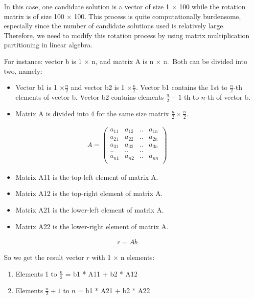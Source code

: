 \documentclass[
]{article}
\providecommand{\tightlist}{%
  \setlength{\itemsep}{0pt}\setlength{\parskip}{0pt}}
\begin{document}
In this case, one candidate solution is a vector of size 1 \(\times\)
100 while the rotation matrix is of size 100 \(\times\) 100. This
process is quite computationally burdensome, especially since the number
of candidate solutions used is relatively large. Therefore, we need to
modify this rotation process by using matrix multiplication partitioning
in linear algebra.

For instance: vector b is 1 \(\times\) n, and matrix A is n \(\times\)
n.~Both can be divided into two, namely:

\begin{itemize}
\tightlist
\item
  Vector b1 is 1 \(\times \frac{n}{2}\) and vector b2 is 1
  \(\times \frac{n}{2}\). Vector b1 contains the 1st to
  \(\frac{n}{2}\)-th elements of vector b. Vector b2 contains elements
  \(\frac{n}{2} + 1\)-th to \(n\)-th of vector b.
\item
  Matrix A is divided into 4 for the same size matrix
  \(\frac{n}{2} \times \frac{n}{2}\).
\end{itemize}

\begin{align}
A = \begin{pmatrix}
a_{11} & a_{12} & .. & a_{1n} \\
a_{21} & a_{22} & .. & a_{2n} \\
a_{31} & a_{32} & .. & a_{3n} \\
.. & .. & .. \\
a_{n1} & a_{n2} & .. & a_{nn} \\
\end{pmatrix}
\end{align}

\begin{itemize}
\tightlist
\item
  Matrix A11 is the top-left element of matrix A.
\item
  Matrix A12 is the top-right element of matrix A.
\item
  Matrix A21 is the lower-left element of matrix A.
\item
  Matrix A22 is the lower-right element of matrix A.
\end{itemize}

\begin{align}
r = A b
\end{align}

So we get the result vector \(r\) with 1 \(\times\) n elements:

\begin{enumerate}
\def\labelenumi{\arabic{enumi}.}
\tightlist
\item
  Elements 1 to \(\frac{n}{2}\) = b1 * A11 + b2 * A12
\item
  Elements \(\frac{n}{2} + 1\) to \(n\) = b1 * A21 + b2 * A22
\end{enumerate}
\end{document}
